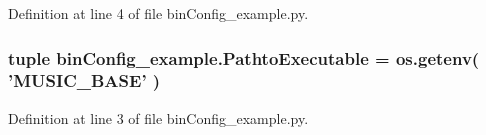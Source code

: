 Definition at line 4 of file bin\-Config\-\_\-example.\-py.

\subsubsection[{Pathto\-Executable}]{\setlength{\rightskip}{0pt plus 5cm}tuple bin\-Config\-\_\-example.\-Pathto\-Executable = os.\-getenv( 'M\-U\-S\-I\-C\-\_\-\-B\-A\-S\-E' )}\label{namespacebinConfig__example_afa74a05175efd45e5fb0043b57f5706d}


Definition at line 3 of file bin\-Config\-\_\-example.\-py.

